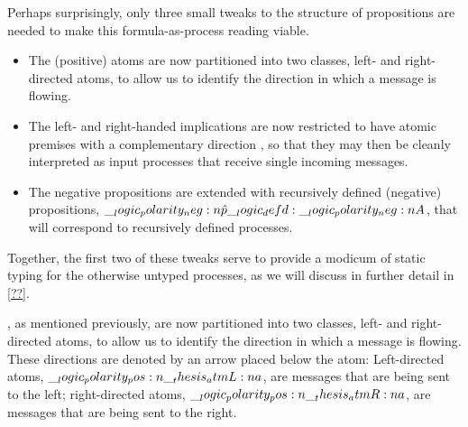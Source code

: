 Perhaps surprisingly, only three small tweaks to the structure of propositions are needed to make this formula-as-process reading viable.
\begin{itemize}
\item
  The (positive) atoms are now partitioned into two classes, left- and right-directed atoms, to allow us to identify the direction in which a message is flowing.

\item
  The left- and right-handed implications are now restricted to have atomic premises with a complementary direction
  , so that they may then be cleanly interpreted as input processes that receive  single incoming messages.

\item 
  The negative propositions are extended with recursively defined (negative) propositions, $\__logic_polarity_neg:n {\hat{p}} \__logic_defd: \__logic_polarity_neg:n {A}$, that will correspond to recursively defined processes.
\end{itemize}
Together, the first two of these tweaks serve to provide a modicum of static typing for the otherwise untyped processes, as we will discuss in further detail in \cref{??}.

, as mentioned previously, are now partitioned into two classes, left- and right-directed atoms, to allow us to identify the direction in which a message is flowing.
These directions are denoted by an arrow placed below the atom:
Left-directed atoms, $\__logic_polarity_pos:n {\__thesis_atmL:n {a}}$, are messages that are being sent to the left; right-directed atoms, $\__logic_polarity_pos:n {\__thesis_atmR:n {a}}$, are messages that are being sent to the right.

